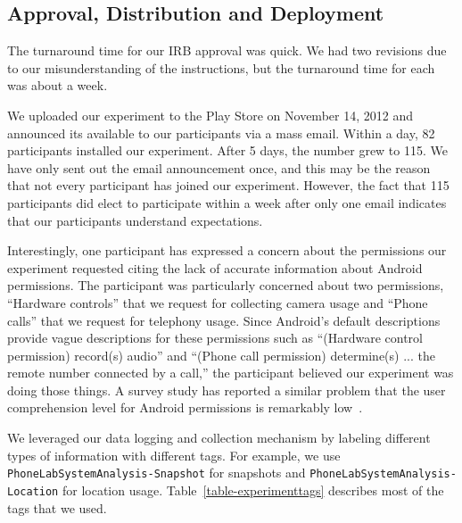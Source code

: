 \subsection{Approval, Distribution and Deployment}

The turnaround time for our IRB approval was quick. We had two revisions due
to our misunderstanding of the instructions, but the turnaround time for each
was about a week.

We uploaded our experiment to the Play Store on November 14, 2012 and
announced its available to our participants via a mass email. Within a day,
82 participants installed our experiment. After 5 days, the number grew to
115. We have only sent out the email announcement once, and this may be the
reason that not every participant has joined our experiment. However, the
fact that 115 participants did elect to participate within a week after only
one email indicates that our participants understand \PhoneLab{}
expectations.

Interestingly, one participant has expressed a concern about the permissions
our experiment requested citing the lack of accurate information about
Android permissions. The participant was particularly concerned about two
permissions, ``Hardware controls'' that we request for collecting camera
usage and ``Phone calls'' that we request for telephony usage. Since
Android's default descriptions provide vague descriptions for these
permissions such as ``(Hardware control permission) record(s) audio'' and
``(Phone call permission) determine(s) ... the remote number connected by a
call,'' the participant believed our experiment was doing those things. A
survey study has reported a similar problem that the user comprehension level
for Android permissions is remarkably low~\cite{felt:soups:2012}.

We leveraged our data logging and collection mechanism by labeling different
types of information with different tags. For example, we use
\texttt{PhoneLabSystemAnalysis-Snapshot} for snapshots and
\texttt{PhoneLabSystemAnalysis-Location} for location usage.
Table~\ref{table-experimenttags} describes most of the tags that we used.
